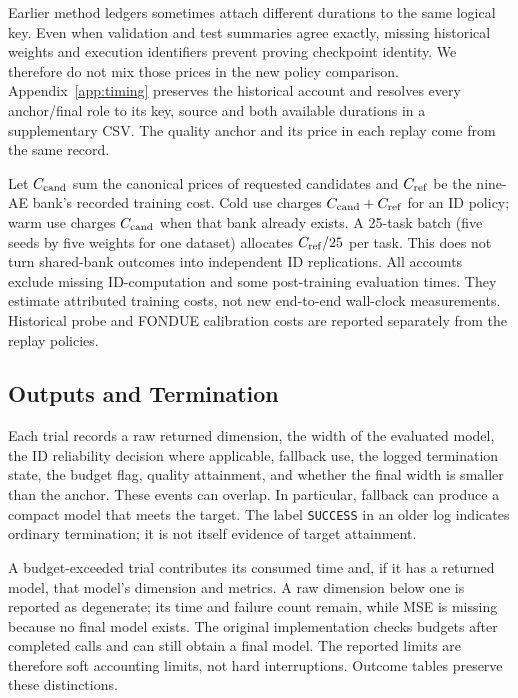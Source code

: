 Earlier method ledgers sometimes attach different durations to the same
logical key. Even when validation and test summaries agree exactly,
missing historical weights and execution identifiers prevent proving
checkpoint identity. We therefore do not mix those prices in the new
policy comparison. Appendix~\ref{app:timing} preserves the historical
account and resolves every anchor/final role to its key, source and both
available durations in a supplementary CSV. The quality anchor and its
price in each replay come from the same record.

Let $C_{\rm cand}$ sum the canonical prices of requested candidates and
$C_{\rm ref}$ be the nine-AE bank's recorded training cost.
Cold use charges $C_{\rm cand}+C_{\rm ref}$ for an ID policy; warm use
charges $C_{\rm cand}$ when that bank already exists. A 25-task batch
(five seeds by five weights for one dataset) allocates $C_{\rm ref}/25$
per task. This does not turn shared-bank outcomes into independent ID
replications. All accounts exclude missing ID-computation and some
post-training evaluation times. They estimate attributed training costs,
not new end-to-end wall-clock measurements. Historical probe and FONDUE
calibration costs are reported separately from the replay policies.

\subsection{Outputs and Termination}\label{sec:outcomes}
Each trial records a raw returned dimension, the width of the evaluated
model, the ID reliability decision where applicable, fallback use, the
logged termination state, the budget flag, quality attainment, and whether
the final width is smaller than the anchor. These events can overlap.
In particular, fallback can produce a compact model that meets the target.
The label \texttt{SUCCESS} in an older log indicates ordinary termination;
it is not itself evidence of target attainment.

A budget-exceeded trial contributes its consumed time and, if it has a
returned model, that model's dimension and metrics. A raw dimension below
one is reported as degenerate; its time and failure count remain, while
MSE is missing because no final model exists. The original implementation
checks budgets after completed calls and can still obtain a final model.
The reported limits are therefore soft accounting limits, not hard
interruptions. Outcome tables preserve these distinctions.

